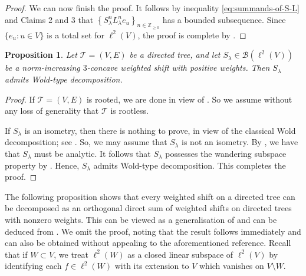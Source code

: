\documentclass[11pt, reqno, a4paper]{amsart}
\newtheorem{proposition}[theorem]{Proposition}
\theoremstyle{definition}
\newcommand{\calB}{{\mathcal{B}}}
\newcommand{\scrT}{{\mathscr T}}
\renewcommand{\ge}{\geqslant}
\newcommand{\Z}{\mathbb Z}
\numberwithin{equation}{section}
\begin{document}
\begin{proof}
We can now finish the proof. It follows by inequality \eqref{eq:summands-of-S-L} and Claims 2 and 3 that $\left\{ S_\lambda ^n L_{\lambda} ^{n} e_u \right\}_{n \in \Z_{\ge 0}}$ has a bounded subsequence. Since $\{ e_u : u \in  V \}$ is a total set for $\ell ^2 ( V)$, the proof is complete by .
\end{proof}

\begin{proposition}
    Let $\scrT = ( V,  E)$ be a directed tree, and let $S_{\lambda} \in \calB (\ell ^2 ( V))$ be a norm-increasing $3$-concave weighted shift with positive weights. Then $S_{\lambda}$ admits Wold-type decomposition.
    \label{prop:wold-type}
\end{proposition}

\begin{proof}
    If $\scrT = ( V,  E)$ is rooted, we are done in view of \cite[Proposition 1.3.4]{MR3740250}. So we assume without any loss of generality that $\scrT$ is rootless. 
    
    If $S_{\lambda}$ is an isometry, then there is nothing to prove, in view of the classical Wold decomposition; see \cite[Theorem 1.1]{MR2760647}. So, we may assume that $S_{\lambda}$ is not an isometry. By , we have that $S_{\lambda}$ must be analytic. It follows that $S_{\lambda}$ possesses the wandering subspace property by . Hence, $S_{\lambda}$ admits Wold-type decomposition. This completes the proof. 
\end{proof}

The following proposition shows that every weighted shift on a directed tree can be decomposed as an orthogonal direct sum of weighted shifts on directed trees with nonzero weights. This can be viewed as a generalisation of \cite[Proposition 3.1.6]{MR2919910} and can be deduced from \cite[Proposition 3.2 and Lemma 3.5]{zbMATH07570541}. We omit the proof, noting that the result follows immediately and can also be obtained without appealing to the aforementioned reference. Recall that if $W \subset V$, we treat $\ell^2(W)$ as a closed linear subspace of $\ell^2(V)$ by identifying each $f\in\ell^2(W)$ with its extension to $V$ which vanishes on $V\setminus W$.
\end{document}
